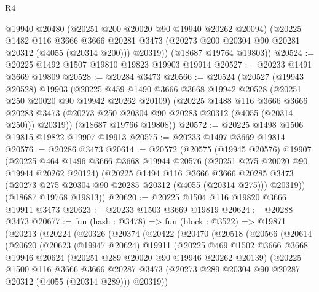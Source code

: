 \begin{lexlean}{R4}
\begin{coremodule}
        @19940
        @20480
        (@20251 @200 @20020 @90 @19940 @20262 @20094)
        (@20225
          @1482
          @116
          @3666
          @3666
          @20281
          @3473
          (@20273 @200 @20304 @90 @20281 @20312 (@4055 (@20314 @200)))
          @20319))
      (@18687 @19764 @19803))
@20524 := @20225 @1492 @1507 @19810 @19823 @19903 @19914
@20527 := @20233 @1491 @3669 @19809
@20528 := @20284 @3473
@20566 := @20524
    (@20527
      (@19943 @20528)
      @19903
      (@20225
        @459
        @1490
        @3666
        @3668
        @19942
        @20528
        (@20251 @250 @20020 @90 @19942 @20262 @20109)
        (@20225
          @1488
          @116
          @3666
          @3666
          @20283
          @3473
          (@20273 @250 @20304 @90 @20283 @20312 (@4055 (@20314 @250)))
          @20319))
      (@18687 @19766 @19808))
@20572 := @20225 @1498 @1506 @19815 @19822 @19907 @19913
@20575 := @20233 @1497 @3669 @19814
@20576 := @20286 @3473
@20614 := @20572
    (@20575
      (@19945 @20576)
      @19907
      (@20225
        @464
        @1496
        @3666
        @3668
        @19944
        @20576
        (@20251 @275 @20020 @90 @19944 @20262 @20124)
        (@20225
          @1494
          @116
          @3666
          @3666
          @20285
          @3473
          (@20273 @275 @20304 @90 @20285 @20312 (@4055 (@20314 @275)))
          @20319))
      (@18687 @19768 @19813))
@20620 := @20225 @1504 @116 @19820 @3666 @19911 @3473
@20623 := @20233 @1503 @3669 @19819
@20624 := @20288 @3473
@20677 := fun (hash : @3478) =>
  fun (block : @3522) =>
  @19871
    (@20213
      (@20224
        (@20326
          (@20374
            (@20422
              (@20470
                (@20518
                  (@20566
                    (@20614
                      (@20620
                        (@20623
                          (@19947 @20624)
                          @19911
                          (@20225
                            @469
                            @1502
                            @3666
                            @3668
                            @19946
                            @20624
                            (@20251 @289 @20020 @90 @19946 @20262 @20139)
                            (@20225
                              @1500
                              @116
                              @3666
                              @3666
                              @20287
                              @3473
                              (@20273 @289 @20304 @90 @20287 @20312 (@4055 (@20314 @289)))
                              @20319))

\end{coremodule}
\end{lexlean}
